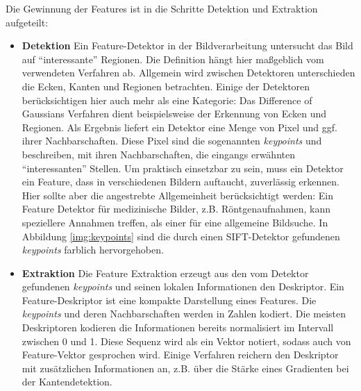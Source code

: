 
Die Gewinnung der Features ist in die Schritte Detektion und Extraktion aufgeteilt: 

\begin{itemize}
	\item \textbf{Detektion} Ein Feature-Detektor in der Bildverarbeitung untersucht das Bild auf \enquote{interessante} Regionen. Die Definition hängt hier maßgeblich vom verwendeten Verfahren ab. Allgemein wird zwischen Detektoren unterschieden die Ecken, Kanten und Regionen betrachten. Einige der Detektoren berücksichtigen hier auch mehr als eine Kategorie: Das Difference of Gaussians Verfahren dient beispielsweise der Erkennung von Ecken und Regionen. Als Ergebnis liefert ein Detektor eine Menge von Pixel und ggf. ihrer Nachbarschaften. Diese Pixel sind die sogenannten \textit{keypoints} und beschreiben, mit ihren Nachbarschaften, die eingangs erwähnten \enquote{interessanten} Stellen.\newline
	 Um praktisch einsetzbar zu sein, muss ein Detektor ein Feature, dass in verschiedenen Bildern auftaucht, zuverlässig erkennen. Hier sollte aber die angestrebte Allgemeinheit berücksichtigt werden: Ein Feature Detektor für medizinische Bilder, z.B. Röntgenaufnahmen, kann speziellere Annahmen treffen, als einer für eine allgemeine Bildsuche. In Abbildung \ref{img:keypoints} sind die durch einen SIFT-Detektor gefundenen \textit{keypoints} farblich hervorgehoben.
	\item \textbf{Extraktion} Die Feature Extraktion erzeugt aus den vom Detektor gefundenen \textit{keypoints} und seinen lokalen Informationen den Deskriptor. Ein Feature-Deskriptor ist eine kompakte Darstellung eines Features. Die \textit{keypoints} und deren Nachbarschaften werden in Zahlen kodiert. Die meisten Deskriptoren kodieren die Informationen bereits normalisiert im Intervall zwischen 0 und 1. Diese Sequenz wird als ein Vektor notiert, sodass auch von Feature-Vektor gesprochen wird. Einige Verfahren reichern den Deskriptor mit zusätzlichen Informationen an, z.B. über die Stärke eines Gradienten bei der Kantendetektion.
\end{itemize}

